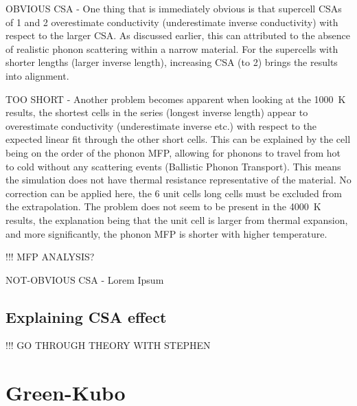OBVIOUS CSA - One thing that is immediately obvious is that supercell CSAs of 1 and 2 overestimate conductivity (underestimate inverse conductivity) with respect to the larger CSA. As discussed earlier, this can attributed to the absence of realistic phonon scattering within a narrow material. For the supercells with shorter lengths (larger inverse length), increasing CSA (to 2) brings the results into alignment. 

TOO SHORT - Another problem becomes apparent when looking at the 1000~K results, the shortest cells in the series (longest inverse length) appear to overestimate conductivity (underestimate inverse etc.) with respect to the expected linear fit through the other short cells. This can be explained by the cell being on the order of the phonon MFP, allowing for phonons to travel from hot to cold without any scattering events (Ballistic Phonon Transport). This means the simulation does not have thermal resistance representative of the material. No correction can be applied here, the 6 unit cells long cells must be excluded from the extrapolation. The problem does not seem to be present in the 4000~K results, the explanation being that the unit cell is larger from thermal expansion, and more significantly, the phonon MFP is shorter with higher temperature.

!!! MFP ANALYSIS?

NOT-OBVIOUS CSA - Lorem Ipsum
















\subsection{\label{sec:3.DM.theory}Explaining CSA effect}

!!! GO THROUGH THEORY WITH STEPHEN


 










\section{\label{sec:3.GK}Green-Kubo}

